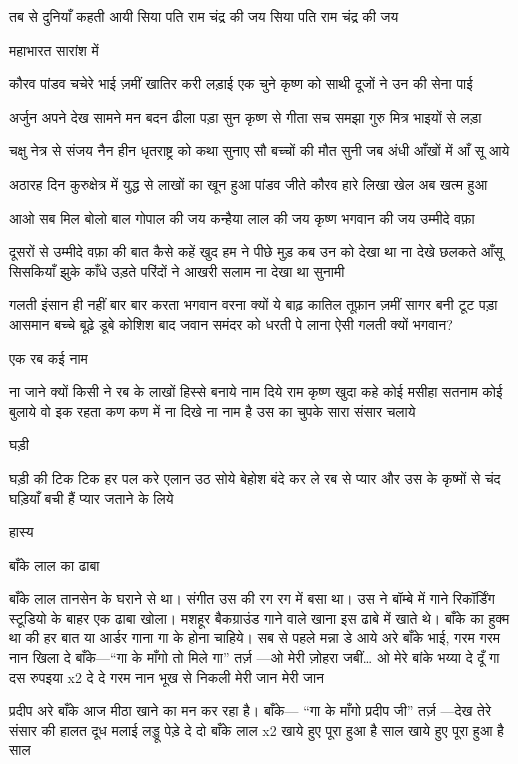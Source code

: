 तब से दुनियाँ कहती आयी
सिया पति राम चंद्र की जय
सिया पति राम चंद्र की जय

महाभारत सारांश में


कौरव पांडव चचेरे भाई
ज़मीं खातिर करी लड़ाई
एक चुने कृष्ण को साथी
दूजों ने उन की सेना पाई

अर्जुन अपने देख सामने
मन बदन ढीला पड़ा
सुन कृष्ण से गीता सच समझा
गुरु मित्र भाइयों से लड़ा

चक्षु नेत्र से संजय नैन हीन
धृतराष्ट्र को कथा सुनाए
सौ बच्चों की मौत सुनी जब
अंधी आँखों में आँ सू आये

अठारह दिन कुरुक्षेत्र में
युद्ध से लाखों का खून हुआ
पांडव जीते कौरव हारे
लिखा खेल अब खत्म हुआ


आओ सब मिल बोलो
बाल गोपाल की जय
कन्हैया लाल की जय
कृष्ण भगवान की जय
उम्मीदे वफ़ा

दूसरों से उम्मीदे वफ़ा की बात कैसे कहें
खुद हम ने पीछे मुड़ कब उन को देखा था
ना देखे छलकते आँसू सिसकियाँ झुके काँधे
उड़ते परिंदों ने आखरी सलाम ना देखा था
सुनामी

गलती इंसान ही नहीं
बार बार करता भगवान
वरना क्यों ये बाढ़ कातिल तूफ़ान
ज़मीं सागर बनी टूट पड़ा आसमान
बच्चे बूढ़े डूबे कोशिश बाद जवान
समंदर को धरती पे लाना
ऐसी गलती क्यों भगवान?

एक रब कई नाम

ना जाने क्यों किसी ने रब के
लाखों हिस्से बनाये नाम दिये
राम कृष्ण खुदा कहे कोई
मसीहा सतनाम कोई बुलाये
वो इक रहता कण कण में
ना दिखे ना नाम है उस का
चुपके सारा संसार चलाये

घड़ी

घड़ी की टिक टिक
हर पल करे एलान
उठ सोये बेहोश बंदे
कर ले रब से प्यार
और उस के कृष्मों से
चंद घड़ियाँ बची हैं
प्यार जताने के लिये









हास्य

बाँके लाल का ढाबा

बाँके लाल तानसेन के घराने से था। संगीत
उस की रग रग में बसा था।
उस ने बॉम्बे में गाने रिकॉर्डिंग स्टूडियो के
बाहर एक ढाबा खोला।
मशहूर बैकग्राउंड गाने वाले खाना इस ढाबे में
खाते थे। बाँके का हुक्म था की हर बात या
आर्डर गाना गा के होना चाहिये।
सब से पहले मन्ना डे आये
अरे बाँके भाई, गरम गरम नान खिला दे
बाँके—“गा के माँगो तो मिले गा”
तर्ज़ —ओ मेरी ज़ोहरा जबीं…
ओ मेरे बांके भय्या
दे दूँ गा दस रुपइया x2
दे दे गरम नान
भूख से निकली मेरी जान
मेरी जान

प्रदीप
अरे बाँके आज मीठा खाने का मन कर रहा
है।
बाँके— “गा के माँगो प्रदीप जी”
तर्ज़ —देख तेरे संसार की हालत
दूध मलाई लड्डू पेड़े दे दो बाँके लाल x2
खाये हुए पूरा हुआ है साल
खाये हुए पूरा हुआ है साल

